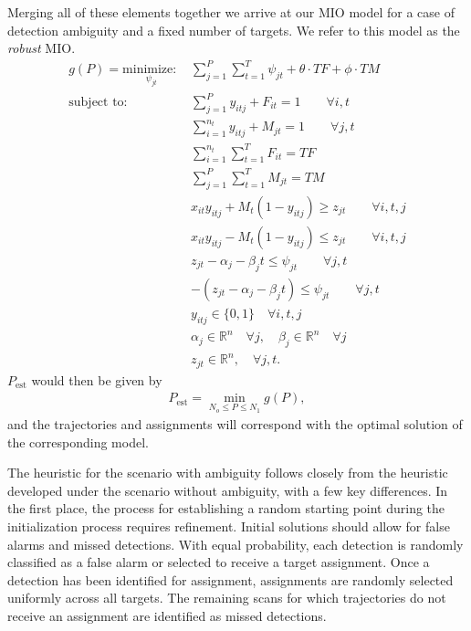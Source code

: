 Merging all of these elements together we arrive at our MIO model for a case of detection ambiguity and a fixed number of targets. We refer to this model as the \textit{robust} MIO. 
\begin{align}
g(P)=\underset{\psi_{jt}}{\text{minimize: }} & \sum_{j=1}^{P} \sum_{t=1}^{T} \psi_{jt} + \theta \cdot TF + \phi \cdot TM \label{eq:simple_robust}\\
\text{subject to: }	& \sum_{j=1}^{P} y_{itj} + F_{it} = 1 \qquad \forall i,t \nonumber \\
				& \sum_{i=1}^{n_{t}} y_{itj} + M_{jt} = 1 \qquad \forall j,t \nonumber\\
				& \sum_{i=1}^{n_{t}} \sum_{t=1}^{T} F_{it} = TF \nonumber \\
				& \sum_{j=1}^{P} \sum_{t=1}^{T} M_{jt} = TM \nonumber \\
				& x_{it}y_{itj} + M_{t}(1-y_{itj}) \geq z_{jt} \qquad \forall i,t,j \nonumber \\
				& x_{it}y_{itj} - M_{t}(1-y_{itj}) \leq z_{jt} \qquad \forall i,t,j \nonumber \\
				& z_{jt} - \alpha_{j} - \beta_{j}t \leq \psi_{jt} \qquad \forall j,t \nonumber \\
				& -(z_{jt} - \alpha_{j} - \beta_{j}t) \leq \psi_{jt} \qquad \forall j,t \nonumber \\
				& y_{itj} \in \{0,1\} \quad \forall i,t,j \nonumber \\
				& \alpha_{j} \in \mathbb{R}^n \quad \forall j ,\quad \beta_{j} \in \mathbb{R}^n \quad \forall j \nonumber\\
				& z_{jt} \in \mathbb{R}^n, \quad \forall j,t. \nonumber
\end{align}
$P_\text{est}$ would then be given by
\begin{align*}
P_\text{est}=\min_{N_o\leq P\leq N_1} g(P),
\end{align*}
and the trajectories and assignments will correspond with the optimal solution of the corresponding model.

\label{sec:Robust_Heuristic}
The heuristic for the scenario with ambiguity follows closely from the heuristic developed under the scenario without ambiguity, with a few key differences. In the first place, the process for establishing a random starting point during the initialization process requires refinement. Initial solutions should allow for false alarms and missed detections. With equal probability, each detection is randomly classified as a false alarm or selected to receive a target assignment. Once a detection has been identified for assignment, assignments are randomly selected uniformly across all targets. The remaining scans for which trajectories do not receive an assignment are identified as missed detections. 

